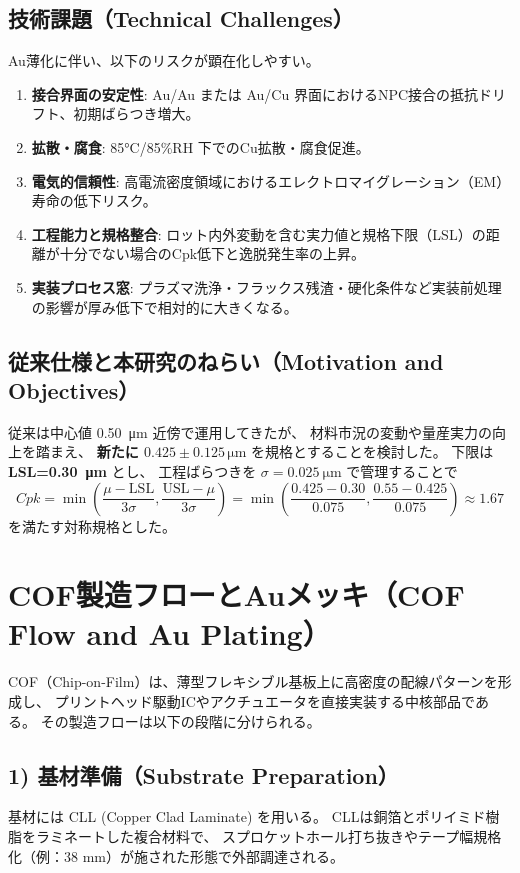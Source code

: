 \documentclass[onecolumn]{IEEEtran} %
\begin{document}
\subsection*{技術課題（Technical Challenges）}
Au薄化に伴い、以下のリスクが顕在化しやすい。
\begin{enumerate}
  \item \textbf{接合界面の安定性}: Au/Au または Au/Cu 界面におけるNPC接合の抵抗ドリフト、初期ばらつき増大。
  \item \textbf{拡散・腐食}: 85\si{\celsius}/85\%RH 下でのCu拡散・腐食促進。
  \item \textbf{電気的信頼性}: 高電流密度領域におけるエレクトロマイグレーション（EM）寿命の低下リスク。
  \item \textbf{工程能力と規格整合}: ロット内外変動を含む実力値と規格下限（LSL）の距離が十分でない場合のCpk低下と逸脱発生率の上昇。
  \item \textbf{実装プロセス窓}: プラズマ洗浄・フラックス残渣・硬化条件など実装前処理の影響が厚み低下で相対的に大きくなる。
\end{enumerate}

\subsection*{従来仕様と本研究のねらい（Motivation and Objectives）}
従来は中心値 \SI{0.50}{\micro\meter} 近傍で運用してきたが、
材料市況の変動や量産実力の向上を踏まえ、
\textbf{新たに $0.425 \pm 0.125\,\si{\micro\meter}$} を規格とすることを検討した。
下限は \textbf{LSL=\SI{0.30}{\micro\meter}} とし、
工程ばらつきを \(\sigma=\SI{0.025}{\micro\meter}\) で管理することで
\[
Cpk=\min\!\left(\frac{\mu-\mathrm{LSL}}{3\sigma},\frac{\mathrm{USL}-\mu}{3\sigma}\right)
=\min\!\left(\frac{0.425-0.30}{0.075},\frac{0.55-0.425}{0.075}\right)\approx1.67
\]
を満たす対称規格とした。

\section{COF製造フローとAuメッキ（COF Flow and Au Plating）}

COF（Chip-on-Film）は、薄型フレキシブル基板上に高密度の配線パターンを形成し、
プリントヘッド駆動ICやアクチュエータを直接実装する中核部品である。
その製造フローは以下の段階に分けられる。

\subsection*{1) 基材準備（Substrate Preparation）}
基材には CLL (Copper Clad Laminate) を用いる。
CLLは銅箔とポリイミド樹脂をラミネートした複合材料で、
スプロケットホール打ち抜きやテープ幅規格化（例：38 mm）が施された形態で外部調達される。
\end{document}

